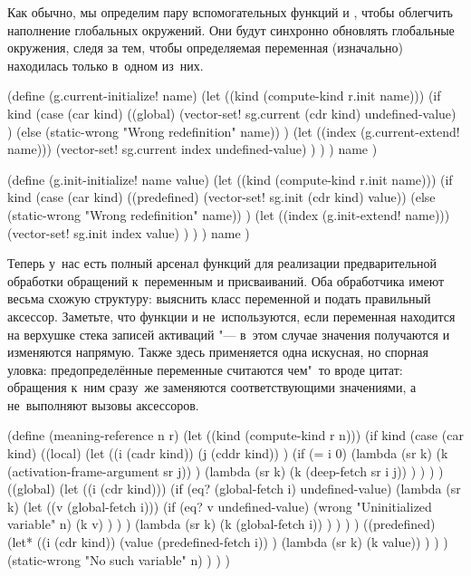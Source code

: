 Как обычно, мы определим пару вспомогательных функций 
и , чтобы облегчить наполнение глобальных окружений.
Они будут синхронно обновлять глобальные окружения, следя за тем, чтобы
определяемая переменная (изначально) находилась только в~одном из~них.

\begin{code:lisp}
(define (g.current-initialize! name)
  (let ((kind (compute-kind r.init name)))
    (if kind
        (case (car kind)
          ((global)
           (vector-set! sg.current (cdr kind) undefined-value) )
          (else (static-wrong "Wrong redefinition" name)) )
        (let ((index (g.current-extend! name)))
          (vector-set! sg.current index undefined-value) ) ) )
  name )

(define (g.init-initialize! name value)
  (let ((kind (compute-kind r.init name)))
    (if kind
        (case (car kind)
          ((predefined) (vector-set! sg.init (cdr kind) value))
          (else (static-wrong "Wrong redefinition" name)) )
        (let ((index (g.init-extend! name)))
          (vector-set! sg.init index value) ) ) )
  name )
\end{code:lisp}


Теперь у~нас есть полный арсенал функций для реализации предварительной
обработки обращений к~переменным и присваиваний. Оба обработчика имеют весьма
схожую структуру: выяснить класс переменной и подать правильный аксессор.
Заметьте, что функции  и  не~используются, если
переменная находится на верхушке стека записей активаций "--- в~этом случае
значения получаются и изменяются напрямую. Также здесь применяется одна
искусная, но спорная уловка: предопределённые переменные считаются чем"~то вроде
цитат: обращения к~ним сразу~же заменяются соответствующими значениями, а
не~выполняют вызовы аксессоров.

\begin{code:lisp}
(define (meaning-reference n r)
  (let ((kind (compute-kind r n)))
    (if kind
        (case (car kind)
          ((local)
           (let ((i (cadr kind))
                 (j (cddr kind)) )
             (if (= i 0)
                 (lambda (sr k)
                   (k (activation-frame-argument sr j)) )
                 (lambda (sr k)
                   (k (deep-fetch sr i j)) ) ) ) )
          ((global)
           (let ((i (cdr kind)))
             (if (eq? (global-fetch i) undefined-value)
                 (lambda (sr k)
                   (let ((v (global-fetch i)))
                     (if (eq? v undefined-value)
                         (wrong "Uninitialized variable" n)
                         (k v) ) ) )
                 (lambda (sr k)
                   (k (global-fetch i)) ) ) ) )
          ((predefined)
           (let* ((i (cdr kind))
                  (value (predefined-fetch i)) )
             (lambda (sr k) (k value)) ) ) )
        (static-wrong "No such variable" n) ) ) )
\end{code:lisp}

